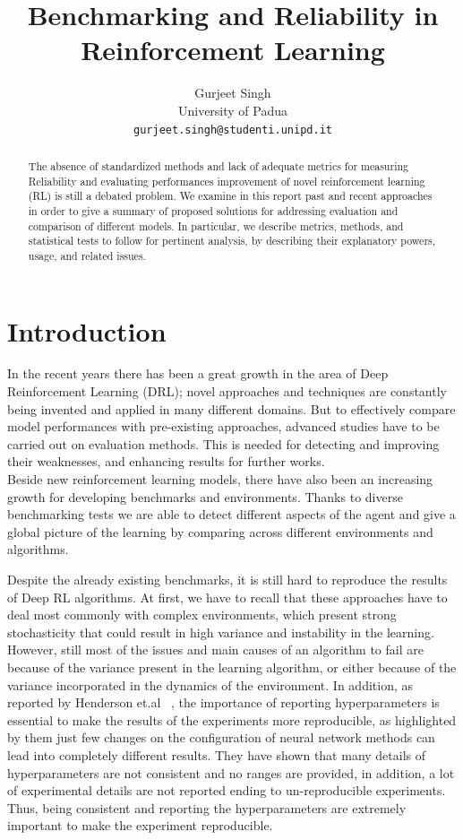 \documentclass{article}
\title{Benchmarking and Reliability in Reinforcement Learning}
\author{Gurjeet Singh\\
  University of Padua\\
  \texttt{gurjeet.singh@studenti.unipd.it}
}
\begin{document}
\maketitle

\begin{abstract}
The absence of standardized methods and lack of adequate metrics for measuring Reliability and evaluating performances improvement of novel reinforcement learning (RL) is still a debated problem.
We examine in this report past and recent approaches in order to give a summary of proposed solutions for addressing evaluation and comparison of different models. In particular, we describe metrics, methods, and statistical tests to follow for pertinent analysis, by describing their explanatory powers, usage, and related issues.
	
\end{abstract}

\section{Introduction}
In the recent years there has been a great growth in the area of Deep Reinforcement Learning (DRL); novel approaches and techniques are constantly being invented and applied in many different domains.
But to effectively compare model performances with pre-existing approaches, advanced studies have to be carried out on evaluation methods.  This is needed for detecting and improving their weaknesses, and enhancing results for further works.\\
Beside new reinforcement learning models, there have also been an increasing growth for developing benchmarks and environments.
Thanks to diverse benchmarking tests we are able to detect different aspects of the agent and give a global picture of the learning by comparing across different environments and algorithms.

Despite the already existing benchmarks, it is still hard to reproduce the results of Deep RL algorithms. At first, we have to recall that these approaches have to deal most commonly with complex environments, which present strong stochasticity that could result in high variance and instability in the learning. However, still most of the issues and main causes of an algorithm to fail are because of the variance present in the learning algorithm, or either because of the variance incorporated in the dynamics of the environment.
In addition, as reported by Henderson et.al ~\cite{DRL01}, the importance of reporting hyperparameters is essential to make the results of the experiments more reproducible, as highlighted by them just few changes on the configuration of neural network methods can lead into completely different results. They have shown that many details of hyperparameters are not consistent and no ranges are provided, in addition, a lot of experimental details are not reported ending to un-reproducible experiments. Thus, being consistent and reporting the hyperparameters are extremely important to make the experiment reproducible.
\end{document}
